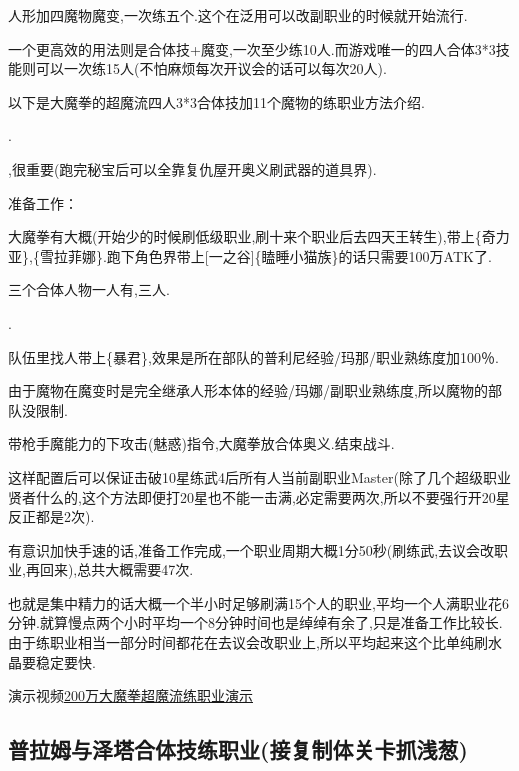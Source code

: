 	人形加四魔物魔变,一次练五个.这个在泛用可以改副职业的时候就开始流行.

	一个更高效的用法则是合体技+魔变,一次至少练10人.而游戏唯一的四人合体3*3技能则可以一次练15人(不怕麻烦每次开议会的话可以每次20人).

	以下是大魔拳的超魔流四人3*3合体技加11个魔物的练职业方法介绍.

	{\color{red}{男主平常就很有用,修罗巴尔战一个杰洛肯可以当好几个人用,部队总攻击需要大量千万级能力角色,榨取如果打算走抓熊可以直接用这个方法}}.

	{\color{red}{记得带上想用的固有魔物,同步魔界探索收集40-1武器}},很重要(跑完秘宝后可以全靠复仇屋开奥义刷武器的道具界).

	准备工作：

	大魔拳有大概{\color{red}{200万能力}}(开始少的时候刷低级职业,刷十来个职业后去四天王转生),带上{\color{red}{[可靠的伙伴]}}\{奇力亚\},{\color{red}{生杀予夺}}\{雪拉菲娜\}.跑下角色界带上[一之谷]\{瞌睡小猫族\}的话只需要100万ATK了.

	三个合体人物一人有{},三人{}.

	{\color{red}{四人放到普利尼部队}}.

	队伍里找人带上{\color{red}{普利尼教育员}}\{暴君\},效果是所在部队的普利尼经验/玛那/职业熟练度加100％.

	由于魔物在魔变时是完全继承人形本体的经验/玛娜/副职业熟练度,所以魔物的部队没限制.

	带枪手魔能力的下攻击(魅惑)指令,大魔拳放合体奥义.结束战斗.

	这样配置后可以保证击破10星练武4后所有人当前副职业Master(除了几个超级职业贤者什么的,这个方法即便打20星也不能一击满,必定需要两次,所以不要强行开20星反正都是2次).

	有意识加快手速的话,准备工作完成,一个职业周期大概1分50秒(刷练武,去议会改职业,再回来),总共大概需要47次.

	也就是集中精力的话大概一个半小时足够刷满15个人的职业,平均一个人满职业花6分钟.就算慢点两个小时平均一个8分钟时间也是绰绰有余了,只是准备工作比较长.由于练职业相当一部分时间都花在去议会改职业上,所以平均起来这个比单纯刷水晶要稳定要快.

	演示视频\href{http://www.bilibili.com/video/av2966618/}{200万大魔拳超魔流练职业演示}

	\newpage

	\subsection{普拉姆与泽塔合体技练职业(接复制体关卡抓浅葱)}


